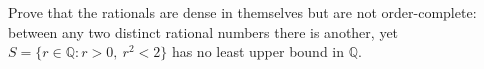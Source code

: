 Prove that the rationals are dense in themselves but are not order-complete: between any two distinct rational numbers there is another, yet $ S=\{r\in\mathbb Q:r>0,\ r^2<2\}$ has no least upper bound in $\mathbb Q $.
